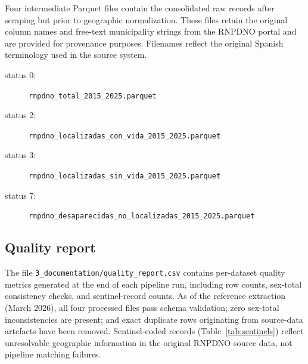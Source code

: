 \documentclass[3p]{elsarticle}
\begin{document}
  Four intermediate Parquet files contain the consolidated raw                                                                                                                                
  records after scraping but prior to geographic normalization.
  These files retain the original column names and free-text                                                                                                                                  
  municipality strings from the RNPDNO portal and are provided                                                                                                                              
  for provenance purposes.                                                                                                                                                                  
  Filenames reflect the original Spanish terminology used in the source system.
                                                                                                                                                                                              
  \begin{description}
    \item[status 0:] \texttt{rnpdno\_total\_2015\_2025.parquet}                                                                                                                               
    \item[status 2:] \texttt{rnpdno\_localizadas\_con\_vida\_2015\_2025.parquet}                                                                                                            
    \item[status 3:] \texttt{rnpdno\_localizadas\_sin\_vida\_2015\_2025.parquet}                                                                                                              
    \item[status 7:] \texttt{rnpdno\_desaparecidas\_no\_localizadas\_2015\_2025.parquet}
  \end{description}                                           

\subsection*{Quality report}

The file \texttt{3\_documentation/quality\_report.csv} contains
per-dataset quality metrics generated at the end of each pipeline
run, including row counts, sex-total consistency checks, and
sentinel-record counts.
As of the reference extraction (March 2026), all four processed files
pass schema validation; zero sex-total inconsistencies are present;
and exact duplicate rows originating from source-data artefacts
have been removed.
Sentinel-coded records (Table~\ref{tab:sentinels}) reflect
unresolvable geographic information in the original RNPDNO source
data, not pipeline matching failures.
\clearpage
\end{document}
